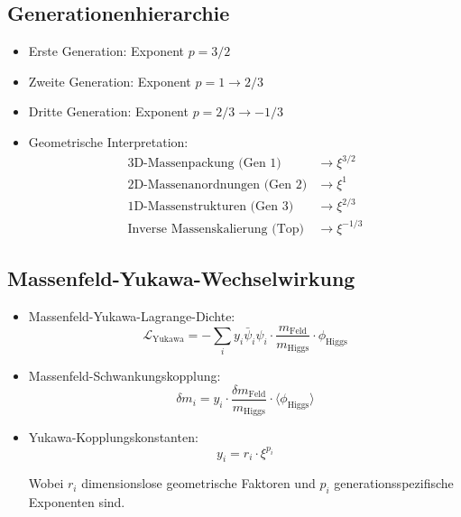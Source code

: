 \documentclass[12pt,a4paper]{article}
\begin{document}
\subsection{Generationenhierarchie}
\begin{itemize}
	\item Erste Generation: Exponent $p = 3/2$
	\item Zweite Generation: Exponent $p = 1 \rightarrow 2/3$
	\item Dritte Generation: Exponent $p = 2/3 \rightarrow -1/3$
	
	\item Geometrische Interpretation:
	\begin{align}
		\text{3D-Massenpackung (Gen 1)} &\rightarrow \xi^{3/2}\\
		\text{2D-Massenanordnungen (Gen 2)} &\rightarrow \xi^1\\
		\text{1D-Massenstrukturen (Gen 3)} &\rightarrow \xi^{2/3}\\
		\text{Inverse Massenskalierung (Top)} &\rightarrow \xi^{-1/3}
	\end{align}
\end{itemize}

\subsection{Massenfeld-Yukawa-Wechselwirkung}
\begin{itemize}
	\item Massenfeld-Yukawa-Lagrange-Dichte:
	\begin{equation}
		\mathcal{L}_{\text{Yukawa}} = -\sum_i y_i \bar{\psi}_i \psi_i \cdot \frac{m_{\text{Feld}}}{m_{\text{Higgs}}} \cdot \phi_{\text{Higgs}}
	\end{equation}
	
	\item Massenfeld-Schwankungskopplung:
	\begin{equation}
		\delta m_i = y_i \cdot \frac{\delta m_{\text{Feld}}}{m_{\text{Higgs}}} \cdot \langle \phi_{\text{Higgs}} \rangle
	\end{equation}
	
	\item Yukawa-Kopplungskonstanten:
	\begin{equation}
		y_i = r_i \cdot \xi^{p_i}
	\end{equation}
	
	Wobei $r_i$ dimensionslose geometrische Faktoren und $p_i$ generationsspezifische Exponenten sind.
\end{itemize}
\end{document}

